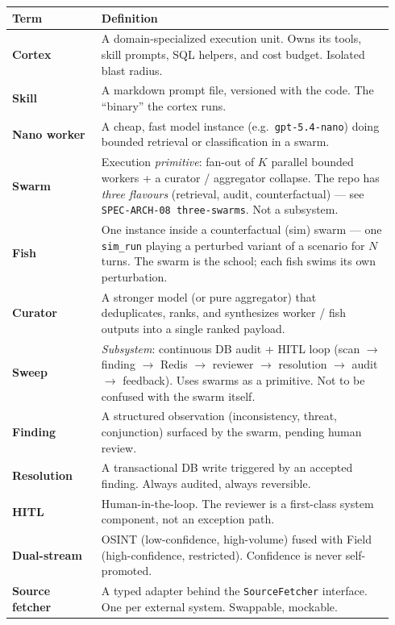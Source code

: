 \begin{longtable}{@{}p{0.22\linewidth}p{0.72\linewidth}@{}}
\toprule
\textbf{Term} & \textbf{Definition} \\
\midrule
\endhead

\textbf{Cortex} &
A domain-specialized execution unit. Owns its tools, skill prompts, SQL helpers, and cost budget. Isolated blast radius. \\

\textbf{Skill} &
A markdown prompt file, versioned with the code. The ``binary'' the cortex runs. \\

\textbf{Nano worker} &
A cheap, fast model instance (e.g.\ \texttt{gpt-5.4-nano}) doing bounded retrieval or classification in a swarm. \\

\textbf{Swarm} &
Execution \emph{primitive}: fan-out of $K$ parallel bounded workers + a curator / aggregator collapse. The repo has \emph{three flavours} (retrieval, audit, counterfactual) --- see \texttt{SPEC-ARCH-08 three-swarms}. Not a subsystem. \\

\textbf{Fish} &
One instance inside a counterfactual (sim) swarm --- one \texttt{sim\_run} playing a perturbed variant of a scenario for $N$ turns. The swarm is the school; each fish swims its own perturbation. \\

\textbf{Curator} &
A stronger model (or pure aggregator) that deduplicates, ranks, and synthesizes worker / fish outputs into a single ranked payload. \\

\textbf{Sweep} &
\emph{Subsystem}: continuous DB audit + HITL loop (scan $\to$ finding $\to$ Redis $\to$ reviewer $\to$ resolution $\to$ audit $\to$ feedback). Uses swarms as a primitive. Not to be confused with the swarm itself. \\

\textbf{Finding} &
A structured observation (inconsistency, threat, conjunction) surfaced by the swarm, pending human review. \\

\textbf{Resolution} &
A transactional DB write triggered by an accepted finding. Always audited, always reversible. \\

\textbf{HITL} &
Human-in-the-loop. The reviewer is a first-class system component, not an exception path. \\

\textbf{Dual-stream} &
OSINT (low-confidence, high-volume) fused with Field (high-confidence, restricted). Confidence is never self-promoted. \\

\textbf{Source fetcher} &
A typed adapter behind the \texttt{SourceFetcher} interface. One per external system. Swappable, mockable. \\

\bottomrule
\end{longtable}


